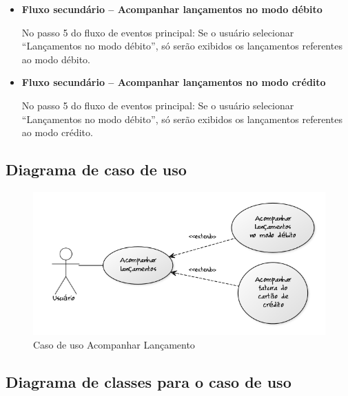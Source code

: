 \begin{itemize}
  \item \textbf{Fluxo secundário – Acompanhar lançamentos no modo débito}

  No passo 5 do fluxo de eventos principal:
  \subitem Se o usuário selecionar ``Lançamentos no modo débito'', só serão exibidos os lançamentos referentes ao modo débito.

  \item \textbf{Fluxo secundário – Acompanhar lançamentos no modo crédito}

  No passo 5 do fluxo de eventos principal:
  \subitem Se o usuário selecionar ``Lançamentos no modo débito'', só serão exibidos os lançamentos referentes ao modo crédito.
\end{itemize}

\subsection{Diagrama de caso de uso}

\begin{figure}[!htb]
     \centering
     \includegraphics[scale=0.6]{diagramas/caso-de-uso/imagens/acompanharLancamento.png}
     \caption{Caso de uso Acompanhar Lançamento}
\end{figure}

\subsection{Diagrama de classes para o caso de uso}
